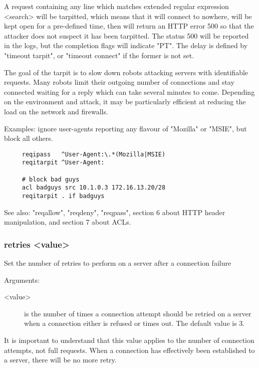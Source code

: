   A request containing any line which matches extended regular expression
  <search> will be tarpitted, which means that it will connect to nowhere, will
  be kept open for a pre-defined time, then will return an HTTP error 500 so
  that the attacker does not suspect it has been tarpitted. The status 500 will
  be reported in the logs, but the completion flags will indicate "PT". The
  delay is defined by "timeout tarpit", or "timeout connect" if the former is
  not set.

  The goal of the tarpit is to slow down robots attacking servers with
  identifiable requests. Many robots limit their outgoing number of connections
  and stay connected waiting for a reply which can take several minutes to
  come. Depending on the environment and attack, it may be particularly
  efficient at reducing the load on the network and firewalls.

  Examples: ignore user-agents reporting any flavour of "Mozilla" or "MSIE", but block all others.
  \begin{verbatim}
     reqipass   ^User-Agent:\.*(Mozilla|MSIE)
     reqitarpit ^User-Agent:

     # block bad guys
     acl badguys src 10.1.0.3 172.16.13.20/28
     reqitarpit . if badguys
  \end{verbatim}

  See also: "reqallow", "reqdeny", "reqpass", section 6 about HTTP header
            manipulation, and section 7 about ACLs.

\subsubsection[retries]{retries <value>}


  Set the number of retries to perform on a server after a connection failure


  Arguments:
  \begin{description}
  \item[<value>] is the number of times a connection attempt should be retried on
              a server when a connection either is refused or times out. The
              default value is 3.
  \end{description}
  
  It is important to understand that this value applies to the number of
  connection attempts, not full requests. When a connection has effectively
  been established to a server, there will be no more retry.

